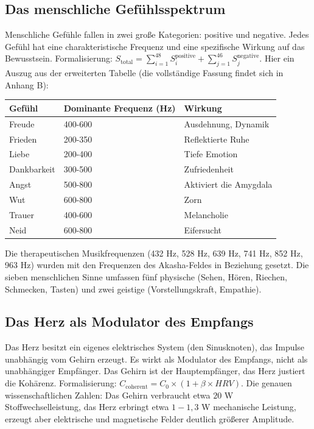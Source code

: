 \documentclass[11pt,a4paper]{article}
\begin{document}
\subsection{Das menschliche Gefühlsspektrum}
Menschliche Gefühle fallen in zwei große Kategorien: positive und negative. Jedes Gefühl hat eine charakteristische Frequenz und eine spezifische Wirkung auf das Bewusstsein. Formalisierung: $S_{\text{total}} = \sum_{i=1}^{48} S_i^{\text{positive}} + \sum_{j=1}^{46} S_j^{\text{negative}}$. Hier ein Auszug aus der erweiterten Tabelle (die vollständige Fassung findet sich in Anhang B):
\begin{table}[H]
\centering
\begin{tabular}{@{}lll@{}}
\toprule
\textbf{Gefühl} & \textbf{Dominante Frequenz (Hz)} & \textbf{Wirkung} \\ \midrule
Freude & 400-600 & Ausdehnung, Dynamik \\
Frieden & 200-350 & Reflektierte Ruhe \\
Liebe & 200-400 & Tiefe Emotion \\
Dankbarkeit & 300-500 & Zufriedenheit \\
Angst & 500-800 & Aktiviert die Amygdala \\
Wut & 600-800 & Zorn \\
Trauer & 400-600 & Melancholie \\
Neid & 600-800 & Eifersucht \\ \bottomrule
\end{tabular}
\end{table}
Die therapeutischen Musikfrequenzen (432 Hz, 528 Hz, 639 Hz, 741 Hz, 852 Hz, 963 Hz) wurden mit den Frequenzen des Akasha-Feldes in Beziehung gesetzt. Die sieben menschlichen Sinne umfassen fünf physische (Sehen, Hören, Riechen, Schmecken, Tasten) und zwei geistige (Vorstellungskraft, Empathie).

\subsection{Das Herz als Modulator des Empfangs}
Das Herz besitzt ein eigenes elektrisches System (den Sinusknoten), das Impulse unabhängig vom Gehirn erzeugt. Es wirkt als Modulator des Empfangs, nicht als unabhängiger Empfänger. Das Gehirn ist der Hauptempfänger, das Herz justiert die Kohärenz. Formalisierung: $C_{\text{coherent}} = C_0 \times (1 + \beta \times HRV)$. Die genauen wissenschaftlichen Zahlen: Das Gehirn verbraucht etwa $20$ W Stoffwechselleistung, das Herz erbringt etwa $1-1,3$ W mechanische Leistung, erzeugt aber elektrische und magnetische Felder deutlich größerer Amplitude.
\end{document}
